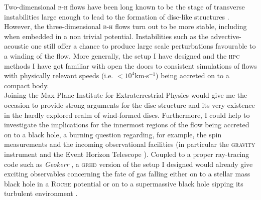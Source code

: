 \documentclass[a4paper,12pt,onecolumn]{article}
\begin{document}
\indent Two-dimensional \textsc{b-h} flows have been long known to be the stage of transverse instabilities large enough to lead to the formation of disc-like structures \citep{Blondin2013}. However, the three-dimensional \textsc{b-h} flows turn out to be more stable, including when embedded in a non trivial potential. Instabilities such as the advective-acoustic one still offer a chance to produce large scale perturbations favourable to a winding of the flow. More generally, the setup I have designed and the \textsc{hpc} methods I have got familiar with open the doors to consistent simulations of flows with physically relevant speeds (i.e. $<10^4$km$\cdot$s$^{-1}$) being accreted on to a compact body.\\
\indent Joining the Max Planc Institute for Extraterrestrial Physics would give me the occasion to provide strong arguments for the disc structure and its very existence in the hardly explored realm of wind-formed discs. Furthermore, I could help to investigate the implications for the innermost regions of the flow being accreted on to a black hole, a burning question regarding, for example, the spin measurements \cite{Penna:2010tp} and the incoming observational facilities (in particular the \textsc{gravity} instrument \cite{Eisenhauer2011} and the Event Horizon Telescope \cite{Doeleman2009}). Coupled to a proper ray-tracing code such as \textit{Geokerr} \cite{Dexter2009}, a \textsc{grhd} version of the setup I designed would already give exciting observables concerning the fate of gas falling either on to a stellar mass black hole in a \textsc{Roche} potential or on to a supermassive black hole sipping its turbulent environment \cite{Ruffert1994b}. 
\end{document}

